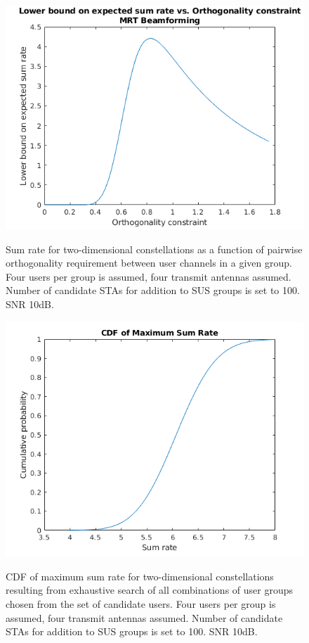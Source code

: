 \begin{figure}
    \centering
    \includegraphics[width=18cm]{figs/100_candidate_mrt.png}\\
    \caption{Sum rate for two-dimensional constellations as a function of pairwise orthogonality requirement between user channels in a given group. Four users per group is assumed, four transmit antennas assumed. Number of candidate STAs for addition to SUS groups is set to 100. SNR 10dB.}
    \label{fig:100_candidate}
\end{figure}

\begin{figure}
    \centering
    \includegraphics[width=18cm]{figs/cdf_4gs_100cand_1Ptx_0_1Pn.png}\\
    \caption{CDF of maximum sum rate for two-dimensional constellations resulting from exhaustive search of all combinations of user groups chosen from the set of candidate users.  Four users per group is assumed, four transmit antennas assumed. Number of candidate STAs for addition to SUS groups is set to 100. SNR 10dB.}
    \label{fig:100_candidate_cdf}
\end{figure}

